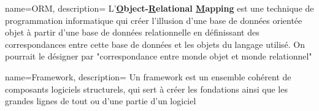 {
    name=ORM,
    description=
    {
        L'\textbf{\underline{O}bject-\underline{R}elational \underline{M}apping} est une technique de programmation informatique qui créer l'illusion d'une base de données orientée objet à partir d'une base de données relationnelle en définissant des correspondances entre cette base de données et les objets du langage utilisé. On pourrait le désigner par "correspondance entre monde objet et monde relationnel"
    }
}

{
    name=Framework,
    description=
    {
        Un framework est un ensemble cohérent de composants logiciels structurels, qui sert à créer les fondations ainsi que les grandes lignes de tout ou d’une partie d'un logiciel
    }
}
